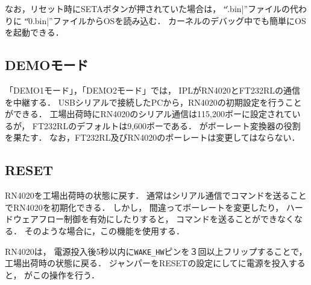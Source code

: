 なお，リセット時にSETAボタンが押されていた場合は，
``\|.bin|''ファイルの代わりに
``\|0.bin|''ファイルからOSを読み込む．
カーネルのデバッグ中でも簡単にOSを起動できる．

\subsection{DEMOモード}
「DEMO1モード」，「DEMO2モード」では，
IPLがRN4020とFT232RLの通信を中継する．
USBシリアルで接続したPCから，RN4020の初期設定を行うことができる．
工場出荷時にRN4020のシリアル通信は115,200ボーに設定されているが，
FT232RLのデフォルトは9,600ボーである．
{\tac}がボーレート変換器の役割を果たす．
なお，FT232RL及びRN4020のボーレートは変更してはならない．

\subsection{RESET}
RN4020を工場出荷時の状態に戻す．
通常はシリアル通信でコマンドを送ることでRN4020を初期化できる．
しかし，
間違ってボーレートを変更したり，
ハードウェアフロー制御を有効にしたりすると，
コマンドを送ることができなくなる．
そのような場合に，この機能を使用する．

RN4020は，
電源投入後5秒以内に\texttt{WAKE\_HW}ピンを３回以上フリップすることで，
工場出荷時の状態に戻る．
ジャンパーをRESETの設定にして{\tecS}に電源を投入すると，
{\tac}がこの操作を行う．

